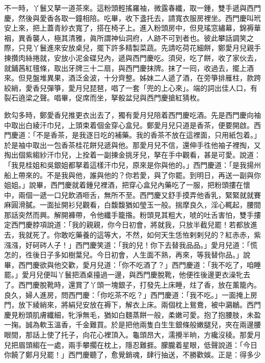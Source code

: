 不一時，丫鬟又拏一道茶來。這粉頭輕搖羅袖，微露春纖，取一鍾，雙手遞與西門慶，然後與愛香各取一鐘相陪。吃畢，收下盞托去，請寬衣服房裡坐。西門慶叫玳安上來，把上蓋青紗衣寬了，搭在椅子上。{}進入粉頭房中，但見瑤窓繡幕，錦褥華裀，異香襲人，極其清雅，眞所謂神仙洞府，人跡不可到者也。彼此攀話調笑之際，只見丫鬟進來安放桌兒，擺下許多精製菜蔬。先請吃荷花細餅，鄭愛月兒親手揀攢肉絲捲就，安放小泥金碟兒內，遞與西門慶吃。須臾，吃了餅，收了家伙去，就鋪茜紅氊條，取出牙牌三十二扇，與西門慶抹牌。抹了一囘，收過去，擺上酒來。但見盤堆異果，酒泛金波，十分齊整。姊妹二人遞了酒，在旁箏排雁柱，款跨絞綃，愛香兒彈箏，愛月兒琵琶，唱了一套「兜的上心來」。{}端的詞出佳人口，有裂石遶梁之聲。唱畢，促席而坐，拏骰盆兒與西門慶搶紅猜枚。

飲勾多時，鄭愛香兒推更衣出去了，獨有愛月兒陪着西門慶吃酒。先是西門慶向袖中取出白綾汗巾兒，上頭束着個金穿心盒兒。鄭愛月兒只道是香茶，便要開啟。西門慶道：「不是香茶，是我逐日吃的補藥。{}我的香茶不放在這裡面，只用紙包着。」於是袖中取出一包香茶桂花餅兒遞與他。那愛月兒不信，還伸手徃他袖子裡掏，又掏出個紫縐紗汗巾兒，上拴着一副揀金挑牙兒，拏在手中觀看，甚是可愛。說道：「我見桂姐和吳銀姐都拏着這樣汗巾兒，原來是你與他的。」西門慶道：「是我揚州船上帶來的。不是我與他，誰與他的？你若愛，與了你罷。到明日，再送一副與你姐姐。」說畢，西門慶就着鍾兒裡酒，把穿心盒兒內藥吃了一服，把粉頭摟在懷中，兩個一遞一口兒飲酒咂舌，無所不至。西門慶又舒手摸弄他香乳，緊緊就就賽麻圓滑膩。一面扯開衫兒觀看，白馥馥猶如瑩玉一般。揣摩良久，淫心輒起，腰間那話突然而興。解開褲帶，令他纖手籠揝。粉頭見其粗大，唬的吐舌害怕，雙手摟定西門慶脖項說道：「我的親親，你今日初會，將就我，只放半截兒罷！若都放進去，我就死了。你敢吃藥養的這等大，不然，如何天生恁恠剌剌兒的？紅赤赤，紫漒漒，好砢硶人子！」西門慶笑道：「我的兒！你下去替我品品。」愛月兒道：「慌怎的，徃後日子多如樹葉兒。今日初會，人生面不熟，再來，等我替你品。」說畢，西門慶欲與他交歡，愛月兒道：「你不吃酒了？」西門慶道：「我不吃了，咱睡罷。」愛月兒便叫丫鬟把酒桌擡過一邊，與西門慶脫靴，他便徃後邊更衣澡牝去了。西門慶脫靴時，還賞了丫頭一塊銀子，打發先上床睡，炷了香，放在薰籠內。良久，婦人進房，問西門慶：「你吃茶不吃？」西門慶道：「我不吃。」{}一面掩上房門，放下綾綃來，將絹兒安放在褥下，解衣上床。兩個枕上鴛鴦，被中鸂鶒。西門慶見粉頭肌膚纖細，牝淨無毛，猶如白麵蒸餅一般，柔嫩可愛。抱了抱腰肢，未盈一掬。誠為軟玉溫香，千金難買。於是把他兩隻白生生銀條般嫩腿兒，夾在兩邊腰眼間，那話上使了托子，向花心裡頂入。龜頭昂大，濡攪半晌，方纔沒稜。那愛月兒把眉頭縐在一處，兩手攀擱在枕上，隱忍難捱。朦朧着星眼，低聲說道：「今日你饒了鄭月兒罷！」西門慶聽了，愈覺銷魂，肆行抽送，不勝歡娛。正是：得多少

